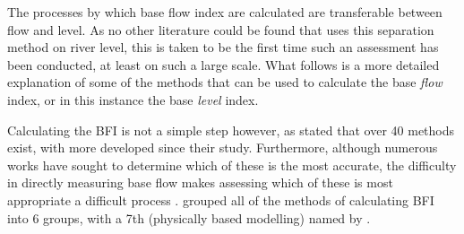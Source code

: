 \documentclass[DIV=calc, paper=a4, fontsize=11pt, twocolumn]{scrartcl}	 %
\begin{document}
The processes by which base flow index are calculated are transferable between flow and level. As no other literature could be found that uses this separation method on river level, this is taken to be the first time such an assessment has been conducted, at least on such a large scale. What follows is a more detailed explanation of some of the methods that can be used to calculate the base \textit{flow} index, or in this instance the base \textit{level} index.

Calculating the BFI is not a simple step however, as \citet{Nejadhashemi2009} stated that over 40 methods exist, with more developed since their study. Furthermore, although numerous works have sought to determine which of these is the most accurate, the difficulty in directly measuring base flow makes assessing which of these is most appropriate a difficult process \citep{Li2013}. \citet{Nejadhashemi2009} grouped all of the methods of calculating BFI into 6 groups, with a 7th (physically based modelling) named by \citet{Li2013}.
\end{document}
